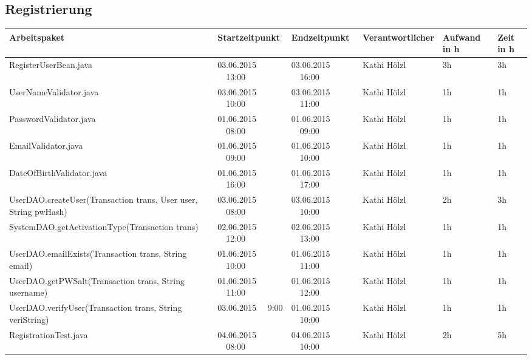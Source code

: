 \begin{landscape}
	\subsection{Registrierung}
	\begin{tabular}{|p{10.3cm}|p{3.2cm}|p{3.2cm}|p{3.5cm}|p{1.7cm}|p{1.5cm}|}
		\hline  \textbf{Arbeitspaket} & \textbf{Startzeitpunkt} & \textbf{Endzeitpunkt} & \textbf{Verantwortlicher}  & \textbf{Aufwand in h} & \textbf{Zeit in h}\\ 
		\hline   RegisterUserBean.java                                & 03.06.2015 \ \ 13:00     & 03.06.2015 \ \ 16:00     & Kathi Hölzl &      3h        &   3h \\
		\hline   UserNameValidator.java                               & 03.06.2015 \ \ 10:00     & 03.06.2015 \ \ 11:00     & Kathi Hölzl &      1h        &   1h\\
		\hline   PasswordValidator.java                               & 01.06.2015 \ \ 08:00     & 01.06.2015 \ \ 09:00     & Kathi Hölzl &      1h        &   1h\\
		\hline   EmailValidator.java                                  & 01.06.2015 \ \ 09:00     & 01.06.2015 \ \ 10:00     & Kathi Hölzl &      1h        &   1h\\
		\hline   DateOfBirthValidator.java                            & 01.06.2015 \ \ 16:00     & 01.06.2015 \ \ 17:00     & Kathi Hölzl &      1h        &   1h\\
		\hline   UserDAO.createUser(Transaction trans, User user, String pwHash)     & 03.06.2015 \ \ 08:00     & 03.06.2015 \ \ 10:00       & Kathi Hölzl  &      2h    &    3h\\
		\hline   SystemDAO.getActivationType(Transaction trans)       & 02.06.2015 \ \ 12:00     & 02.06.2015 \ \ 13:00     & Kathi Hölzl  &      1h        &   1h\\
		\hline   UserDAO.emailExists(Transaction trans, String email) & 01.06.2015 \ \ 10:00     & 01.06.2015 \ \ 11:00     & Kathi Hölzl  &      1h        &   1h\\
		\hline   UserDAO.getPWSalt(Transaction trans, String username) & 01.06.2015 \ \ 11:00     & 01.06.2015 \ \ 12:00     & Kathi Hölzl  &      1h        &   1h\\
		\hline   UserDAO.verifyUser(Transaction trans, String veriString) & 03.06.2015 \ \ 9:00     & 01.06.2015 \ \ 10:00  & Kathi Hölzl  &      1h        &   1h\\
		\hline   RegistrationTest.java                                & 04.06.2015 \ \ 08:00     & 04.06.2015 \ \ 10:00     & Kathi Hölzl  &      2h        &   5h\\
		\hline 
	\end{tabular} \ \\
	\ \\
	

\end{landscape}
